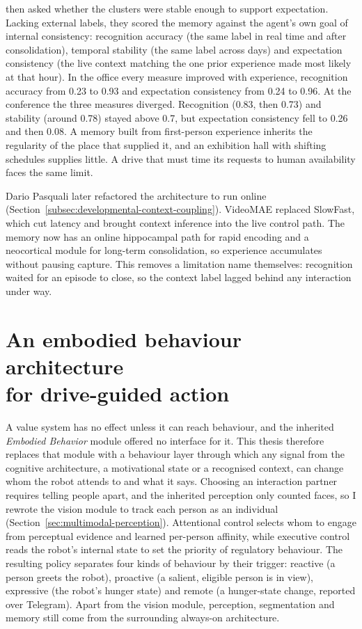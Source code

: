 \citet{Pasquali2026ISEED} then asked whether the clusters were stable enough to support expectation. Lacking external labels, they scored the memory against the agent's own goal of internal consistency: recognition accuracy (the same label in real time and after consolidation), temporal stability (the same label across days) and expectation consistency (the live context matching the one prior experience made most likely at that hour). In the office every measure improved with experience, recognition accuracy from 0.23 to 0.93 and expectation consistency from 0.24 to 0.96. At the conference the three measures diverged. Recognition (0.83, then 0.73) and stability (around 0.78) stayed above 0.7, but expectation consistency fell to 0.26 and then 0.08. A memory built from first-person experience inherits the regularity of the place that supplied it, and an exhibition hall with shifting schedules supplies little. A drive that must time its requests to human availability faces the same limit.

Dario Pasquali later refactored the architecture to run online (Section~\ref{subsec:developmental-context-coupling}). VideoMAE replaced SlowFast, which cut latency and brought context inference into the live control path. The memory now has an online hippocampal path for rapid encoding and a neocortical module for long-term consolidation, so experience accumulates without pausing capture. This removes a limitation \citet{Pasquali2025AlwaysOn} name themselves: recognition waited for an episode to close, so the context label lagged behind any interaction under way.

\section[An embodied behaviour architecture for drive-guided action]{An embodied behaviour architecture\\for drive-guided action}
\label{sec:intro-embodied-behaviour-architecture}

A value system has no effect unless it can reach behaviour, and the inherited \emph{Embodied Behavior} module offered no interface for it. This thesis therefore replaces that module with a behaviour layer through which any signal from the cognitive architecture, a motivational state or a recognised context, can change whom the robot attends to and what it says. Choosing an interaction partner requires telling people apart, and the inherited perception only counted faces, so I rewrote the vision module to track each person as an individual (Section~\ref{sec:multimodal-perception}). Attentional control selects whom to engage from perceptual evidence and learned per-person affinity, while executive control reads the robot's internal state to set the priority of regulatory behaviour. The resulting policy separates four kinds of behaviour by their trigger: reactive (a person greets the robot), proactive (a salient, eligible person is in view), expressive (the robot's hunger state) and remote (a hunger-state change, reported over Telegram). Apart from the vision module, perception, segmentation and memory still come from the surrounding always-on architecture.


